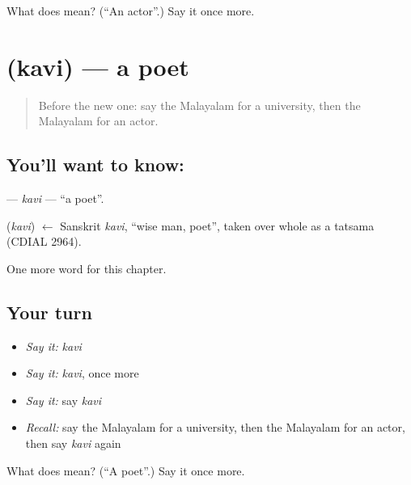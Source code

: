 \begin{tcolorbox}[breakable,colback=teal!4,colframe=teal!35!black,title={Before you move on}]
What does  mean? (\textquotedblleft{}An actor\textquotedblright{}.) Say it once more.
\end{tcolorbox}
\section[\texorpdfstring{\ml{കവി} (kavi)}{കവി (kavi)}]{ (kavi) — a poet}

\label{lesson:ML-C300-kavi}



\begin{quote}
Before the new one: say the Malayalam for a university, then the Malayalam for an actor.
\end{quote}

\subsection*{You'll want to know: }
\textbf{} — \emph{kavi} — \textquotedblleft{}a poet\textquotedblright{}.

\begin{cousinweb}
\textbf{} (\emph{kavi}) $\leftarrow$ Sanskrit \emph{kavi}, \textquotedblleft{}wise man, poet\textquotedblright{}, taken over whole as a tatsama (CDIAL 2964).
\end{cousinweb}

\begin{grammarlens}[title={What you've built}]
One more word for this chapter.
\end{grammarlens}

\subsection*{Your turn}
\begin{itemize}
\raggedright
  \item \emph{Say it:} \emph{kavi}
  \item \emph{Say it:} \emph{kavi}, once more
  \item \emph{Say it:} say \emph{kavi}
  \item \emph{Recall:} say the Malayalam for a university, then the Malayalam for an actor, then say \emph{kavi} again
\end{itemize}

\begin{tcolorbox}[breakable,colback=teal!4,colframe=teal!35!black,title={Before you move on}]
What does  mean? (\textquotedblleft{}A poet\textquotedblright{}.) Say it once more.
\end{tcolorbox}
